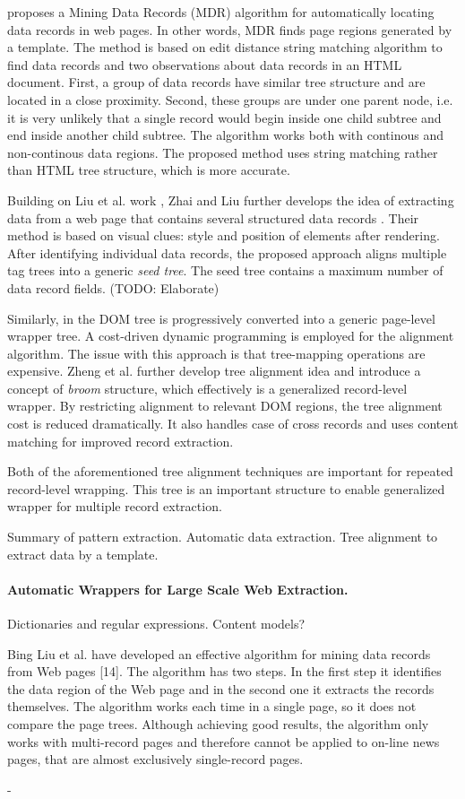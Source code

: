 \cite{liu2009a} proposes a Mining Data Records (MDR) algorithm for automatically locating data records in web pages. In other words, MDR finds page regions generated by a template. The method is based on edit distance string matching algorithm to find data records and two observations about data records in an HTML document. First, a group of data records have similar tree structure and are located in a close proximity. Second, these groups are under one parent node, i.e. it is very unlikely that a single record would begin inside one child subtree and end inside another child subtree. The algorithm works both with continous and non-continous data regions. The proposed method uses string matching rather than HTML tree structure, which is more accurate.

Building on Liu et al. work \cite{liu2009a}, Zhai and Liu further develops the idea of extracting data from a web page that contains several structured data records \cite{zhai2005a}. Their method is based on visual clues: style and position of elements after rendering. After identifying individual data records, the proposed approach aligns multiple tag trees into a generic \emph{seed tree}. The seed tree contains a maximum number of data record fields. (TODO: Elaborate) 

Similarly, in \cite{zheng2007a} the DOM tree is progressively converted into a generic page-level wrapper tree. A cost-driven dynamic programming is employed for the alignment algorithm. The issue with this approach is that tree-mapping operations are expensive. Zheng et al. further develop tree alignment idea \cite{DBLP:conf/cikm/ZhengSWG09} and introduce a concept of \emph{broom} structure, which effectively is a generalized record-level wrapper. By restricting alignment to relevant DOM regions, the tree alignment cost is reduced dramatically. It also handles case of cross records and uses content matching for improved record extraction.

Both of the aforementioned tree alignment techniques are important for repeated record-level wrapping. This tree is an important structure to enable generalized wrapper for multiple record extraction.

Summary of pattern extraction. Automatic data extraction. Tree alignment to extract data by a template.

\paragraph{Automatic Wrappers for Large Scale Web Extraction.} Dictionaries and regular expressions. Content models?

Bing Liu et al. have developed an effective algorithm for mining
data records from Web pages [14]. The algorithm has two steps.
In the first step it identifies the data region of the Web page and in
the second one it extracts the records themselves. The algorithm
works each time in a single page, so it does not compare the page
trees. Although achieving good results, the algorithm only works
with multi-record pages and therefore cannot be applied to on-line
news pages, that are almost exclusively single-record pages.

- 
